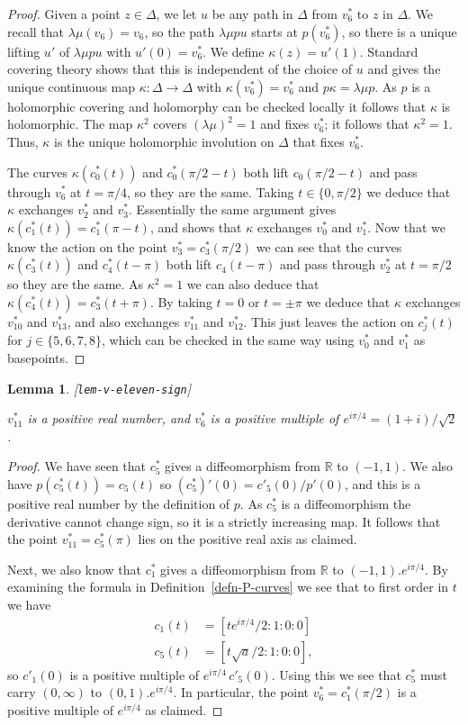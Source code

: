 \documentclass[reqno]{amsart}
\newcommand{\lbl}[1]{\label{#1}\textup{[\texttt{#1}]}\par}
\newcommand{\lbl}{\label}
\newcommand{\Dl}        {\Delta}
\newcommand{\kp}        {\kappa}
\newcommand{\lm}        {\lambda}
\newcommand{\R}         {{\mathbb{R}}}
\newcommand{\rt}        {\sqrt{2}}
\renewcommand{\:}{\colon}
\newtheorem{lemma}[theorem]{Lemma}
\theoremstyle{definition}
\begin{document}
\begin{proof}
 Given a point $z\in\Dl$, we let $u$ be any path in $\Dl$ from $v_6^*$
 to $z$ in $\Dl$.  We recall that $\lm\mu(v_6)=v_6$, so the path
 $\lm\mu p u$ starts at $p(v^*_6)$, so there is a unique lifting $u'$
 of $\lm\mu p u$ with $u'(0)=v^*_6$.  We define $\kp(z)=u'(1)$.
 Standard covering theory shows that this is independent of the choice
 of $u$ and gives the unique continuous map $\kp\:\Dl\to\Dl$ with
 $\kp(v^*_6)=v^*_6$ and $p\kp=\lm\mu p$.  As $p$ is a holomorphic
 covering and holomorphy can be checked locally it follows that $\kp$
 is holomorphic.  The map $\kp^2$ covers $(\lm\mu)^2=1$ and fixes
 $v^*_6$; it follows that $\kp^2=1$.  Thus, $\kp$ is the unique
 holomorphic involution on $\Dl$ that fixes $v^*_6$.

 The curves $\kp(c_0^*(t))$ and $c_0^*(\pi/2-t)$ both lift
 $c_0(\pi/2-t)$ and pass through $v^*_6$ at $t=\pi/4$, so they are the
 same.  Taking $t\in\{0,\pi/2\}$ we deduce that $\kp$ exchanges
 $v^*_2$ and $v^*_3$.  Essentially the same argument gives
 $\kp(c^*_1(t))=c^*_1(\pi-t)$, and shows that $\kp$ exchanges $v^*_0$
 and $v^*_1$.  Now that we know the action on the point
 $v^*_3=c^*_3(\pi/2)$ we can see that the curves $\kp(c^*_3(t))$ and
 $c^*_4(t-\pi)$ both lift $c_4(t-\pi)$ and pass through $v^*_2$ at
 $t=\pi/2$ so they are the same.  As $\kp^2=1$ we can also deduce that
 $\kp(c^*_4(t))=c^*_3(t+\pi)$.  By taking $t=0$ or $t=\pm\pi$ we
 deduce that $\kp$ exchanges $v^*_{10}$ and $v^*_{13}$, and also
 exchanges $v^*_{11}$ and $v^*_{12}$.  This just leaves the action on
 $c^*_j(t)$ for $j\in\{5,6,7,8\}$, which can be checked in the same
 way using $v^*_0$ and $v^*_1$ as basepoints.
\end{proof}

\begin{lemma}\lbl{lem-v-eleven-sign}
 $v^*_{11}$ is a positive real number, and $v^*_6$ is a positive
 multiple of $e^{i\pi/4}=(1+i)/\rt$.
\end{lemma}
\begin{proof}
 We have seen that $c^*_5$ gives a diffeomorphism from $\R$ to
 $(-1,1)$.  We also have $p(c^*_5(t))=c_5(t)$ so
 $(c_5^*)'(0)=c'_5(0)/p'(0)$, and this is a positive real number by
 the definition of $p$.  As $c^*_5$ is a diffeomorphism the derivative
 cannot change sign, so it is a strictly increasing map.  It follows
 that the point $v^*_{11}=c^*_5(\pi)$ lies on the positive real axis
 as claimed.

 Next, we also know that $c^*_1$ gives a diffeomorphism from $\R$
 to $(-1,1).e^{i\pi/4}$.  By examining the formula in
 Definition~\ref{defn-P-curves} we see that to first order in $t$ we
 have
 \begin{align*}
  c_1(t) &= [t e^{i\pi/4}/2:1:0:0] \\
  c_5(t) &= [t \sqrt{a}/2:1:0:0],
 \end{align*}
 so $c'_1(0)$ is a positive multiple of $e^{i\pi/4}\,c'_5(0)$.  Using
 this we see that $c^*_5$ must carry $(0,\infty)$ to
 $(0,1).e^{i\pi/4}$.  In particular, the point $v^*_6=c^*_1(\pi/2)$ is
 a positive multiple of $e^{i\pi/4}$ as claimed.
\end{proof}
\end{document}
